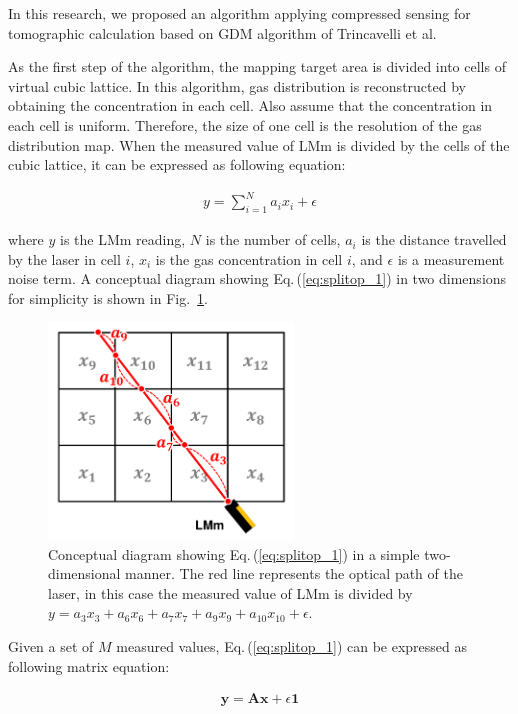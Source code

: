 \documentclass[fleqn,10pt,twocolumn]{SICE19}
\newcommand{\Figref}[1]{Fig.~\ref{#1}}
\newcommand{\Eqref}[1]{Eq.\,(\ref{#1})}
\begin{document}
In this research, we proposed an algorithm applying compressed sensing for tomographic calculation based on GDM algorithm of Trincavelli et al.

As the first step of the algorithm, the mapping target area is divided into cells of virtual cubic lattice. In this algorithm, gas distribution is reconstructed by obtaining the concentration in each cell. Also assume that the concentration in each cell is uniform. Therefore, the size of one cell is the resolution of the gas distribution map. When the measured value of LMm is divided by the cells of the cubic lattice, it can be expressed as following equation:

\begin{eqnarray}
  \label{eq:splitop_1}
  y = \sum_{i=1}^N a_ix_i + \epsilon
\end{eqnarray}

\noindent
where $y$ is the LMm reading, $N$ is the number of cells, $a_i$ is the distance travelled by the laser in cell $i$, $x_i$ is the gas concentration in cell $i$, and $\epsilon$ is a measurement noise term. A conceptual diagram showing \Eqref{eq:splitop_1} in two dimensions for simplicity is shown in \Figref{fig:splitOP}.

\begin{figure}[h]
\begin{center}
\includegraphics[width=65mm]{new_SplitOP}
\caption{\label{fig:splitOP} Conceptual diagram showing \Eqref{eq:splitop_1} in a simple two-dimensional manner.  The red line represents the optical path of the laser, in this case the measured value of LMm is divided by $y=a_{3}x_{3}+a_{6}x_{6}+a_{7}x_{7}+a_{9}x_{9}+a_{10}x_{10}+\epsilon$.
}
\end{center}
\end{figure}

Given a set of $M$ measured values, \Eqref{eq:splitop_1} can be expressed as following matrix equation:

\begin{eqnarray}
  \label{eq:splitop_2}
  \bm{y} = \bm{A}\bm{x} + \epsilon\bm{1}
\end{eqnarray}
\end{document}
